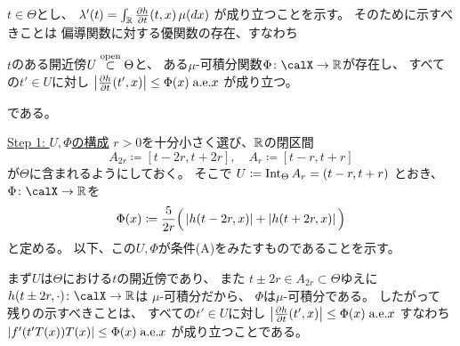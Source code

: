 \documentclass[report]{jlreq}
\begin{document}
\begin{answer}
    $t \in \Theta$とし、
    $\lambda'(t) = \int_\R \deldel[h]{t} (t, x) \, \mu(dx)$
    が成り立つことを示す。
    そのために示すべきことは
    偏導関数に対する優関数の存在、すなわち
    \begin{description}
        \vspace{-1em}
        \item[(A)] $t$のある開近傍$U \stackrel{\text{open}}{\subset} \Theta$と、
            ある$\mu$-可積分関数$\Phi \colon \calX \to \R$が存在し、
            すべての$t' \in U$に対し
            $\myabs{
                \deldel[h]{t}(t', x)
            } \le \Phi(x) \; \text{a.e.$x$}$
            が成り立つ。
    \end{description}
    である。

    \uline{Step 1: $U, \Phi$の構成} \quad
    $r > 0$を十分小さく選び、$\mathbb{R}$の閉区間
    \begin{equation}
        A_{2r} \coloneqq [t - 2r, t + 2r],
            \quad
            A_r \coloneqq [t - r, t + r]
    \end{equation}
    が$\Theta$に含まれるようにしておく。
    そこで
    $U \coloneqq \operatorname{Int}_\Theta A_r = (t - r, t + r)$
    とおき、
    $\Phi \colon \calX \to \R$を
    \begin{equation}
        \Phi(x)
            \coloneqq
            \frac{5}{2r}
            \Big(
                \left|{
                    h(t - 2r, x)
                }\right|
                +
                \left|{
                    h(t + 2r, x)
                }\right|
            \Big)
    \end{equation}
    と定める。
    以下、この$U, \Phi$が条件(A)をみたすものであることを示す。

    まず$U$は$\Theta$における$t$の開近傍であり、
    また
    $t \pm 2r \in A_{2r} \subset \Theta$ゆえに
    $h(t \pm 2r, \cdot) \colon \calX \to \R$は
    $\mu$-可積分だから、
    $\Phi$は$\mu$-可積分である。
    したがって
    残りの示すべきことは、
    すべての$t' \in U$に対し
    $\myabs{
        \deldel[h]{t}(t', x)
    }
        \le \Phi(x) \; \text{a.e.$x$}$
    すなわち
    $\left|{
        f'(t'T(x)) T(x)
    }\right|
        \le \Phi(x) \; \text{a.e.$x$}$
    が成り立つことである。


\end{answer}
\end{document}
